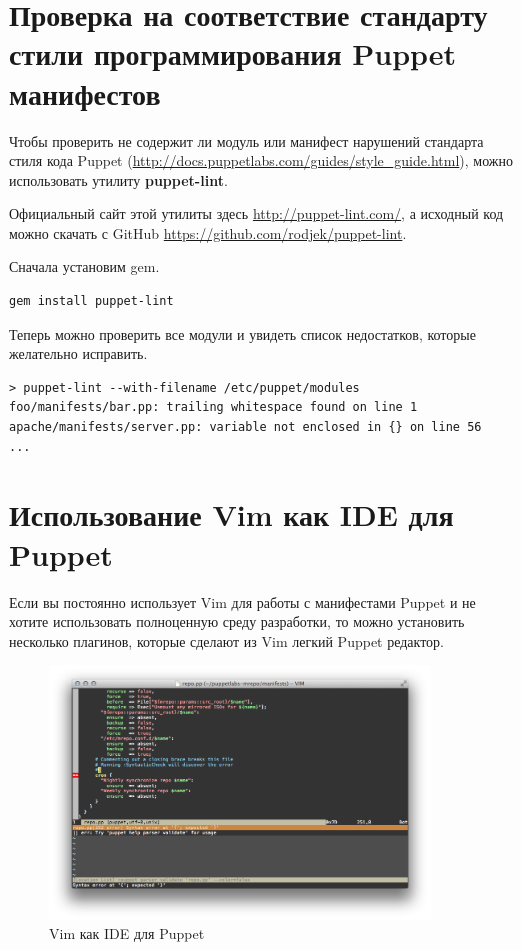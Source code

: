 \section{Проверка на соответствие стандарту стили программирования Puppet манифестов}

Чтобы проверить не содержит ли модуль или манифест нарушений стандарта стиля кода Puppet (\url{http://docs.puppetlabs.com/guides/style_guide.html}), можно использовать утилиту \textbf{puppet-lint}.

Официальный сайт этой утилиты здесь \url{http://puppet-lint.com/}, а исходный код можно скачать с GitHub \url{https://github.com/rodjek/puppet-lint}.

Сначала установим gem.

\begin{verbatim}
gem install puppet-lint
\end{verbatim}

Теперь можно проверить все модули и увидеть список недостатков, которые желательно исправить.

\begin{verbatim}
> puppet-lint --with-filename /etc/puppet/modules
foo/manifests/bar.pp: trailing whitespace found on line 1
apache/manifests/server.pp: variable not enclosed in {} on line 56
...
\end{verbatim}

\section{Использование Vim как IDE для Puppet}

Если вы постоянно использует Vim для работы с манифестами Puppet и не хотите использовать полноценную среду разработки, то можно установить несколько плагинов, которые сделают из Vim легкий Puppet редактор.

\begin{figure}[h]
\centering
\includegraphics[width=0.9\textwidth]{img/syntastic.png}
\caption{Vim как IDE для Puppet}
\label{fig:syntastic}
\end{figure}

